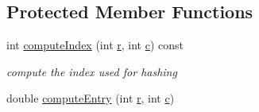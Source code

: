 \subsection*{Protected Member Functions}
\begin{DoxyCompactItemize}
\item 
int \hyperlink{classg2o_1_1MarginalCovarianceCholesky_a51578d6676018d54d74dfe8ce70a9d4b}{compute\+Index} (int \hyperlink{sparse__helper_8cpp_acab531abaa74a7e664e3986f2522b33a}{r}, int \hyperlink{sparse__helper_8cpp_a4e1e0e72dd773439e333c84dd762a9c3}{c}) const 
\begin{DoxyCompactList}\small\item\em compute the index used for hashing \end{DoxyCompactList}\item 
double \hyperlink{classg2o_1_1MarginalCovarianceCholesky_a556f8da80f0873b74b57c82b587b4f97}{compute\+Entry} (int \hyperlink{sparse__helper_8cpp_acab531abaa74a7e664e3986f2522b33a}{r}, int \hyperlink{sparse__helper_8cpp_a4e1e0e72dd773439e333c84dd762a9c3}{c})
\end{DoxyCompactItemize}
